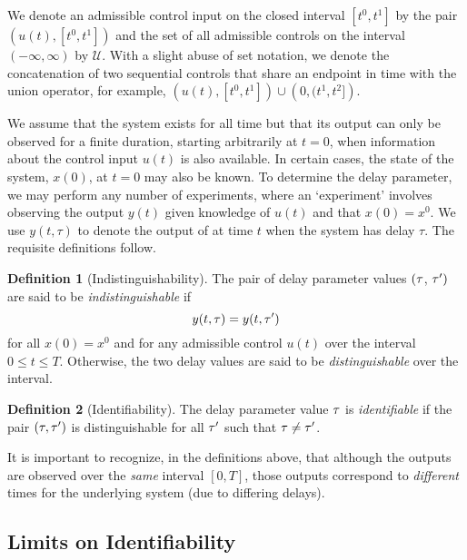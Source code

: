 \documentclass[letterpaper,10pt,conference]{ieeeconf}
\theoremstyle{definition}
\newtheorem{definition}{Definition}
\begin{document}
We denote an admissible control input on the closed interval $[t^{0}, t^{1}]$ by the pair $\left(u(t), [t^{0}, t^{1}]\right)$ and the set of all admissible controls on the interval $(-\infty, \infty)$ by $\mathcal{U}$.
%
With a slight abuse of set notation, we denote the concatenation of two sequential controls that share an endpoint in time with the union operator, for example,
$\left(u(t), [t^{0}, t^{1}]\right) \cup \left(0, (t^{1}, t^{2}]\right)$.

We assume that the system exists for all time but that its output can only be observed for a finite duration, starting arbitrarily at $t = 0$, when information about the control input $u(t)$ is also available.
%
In certain cases, the state of the system, $x(0)$, at $t = 0$ may also be known.
%
To determine the delay parameter, we may perform any number of experiments, where an `experiment' involves observing the output $y(t)$ given knowledge of $u(t)$ and that $x(0) = x^{0}$.
%
We use $y(t, \tau)$ to denote the output of  at time $t$ when the system has delay $\tau$.
%
The requisite definitions follow.

\begin{definition}[Indistinguishability]
The pair of delay parameter values $(\tau$, $\tau')$ are said to be \emph{indistinguishable} if 
%
\begin{equation}
\label{eqn:indistinguishable}
y(t, \tau) = y(t, \tau')
\end{equation}
%
for all $x(0) = x^{0}$ and for any admissible control $u(t)$ over the interval $0 \leq t \leq T$.
%
Otherwise, the two delay values are said to be \emph{distinguishable} over the interval.
\end{definition}

\begin{definition}[Identifiability]
The delay parameter value $\tau$ is \emph{identifiable} if the pair $(\tau, \tau')$ is distinguishable for all $\tau'$ such that $\tau \neq \tau'$.
\end{definition}

It is important to recognize, in the definitions above, that although the outputs are observed over the \emph{same} interval $[0, T]$, those outputs correspond to \emph{different} times for the underlying system (due to differing delays).

\subsection{Limits on Identifiability}
\label{subsec:ident_limits}
\end{document}
